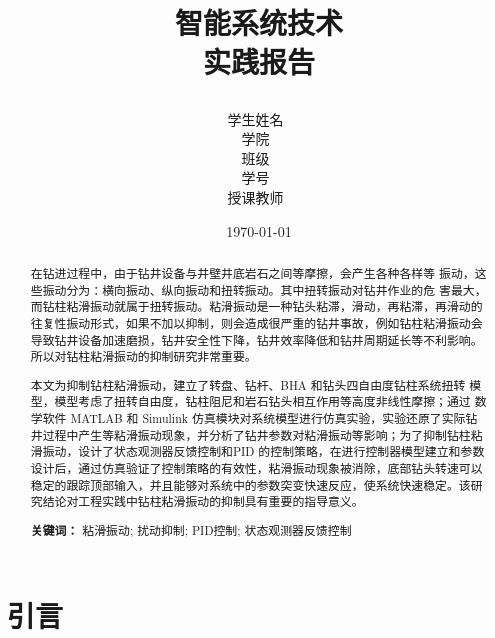 \documentclass[12pt,hyperref,a4paper,UTF8]{ctexart}
\title{ 
		\heiti \xiaochuhao \textbf{{智能系统技术\\实践报告}} \par
		\vspace{1cm}
	}
\author{
		\vspace{0.5cm}
		\kaishu\Large 学生姓名\ \dlmu[9cm]{曾康慧} \qquad \\ %
		\vspace{0.5cm}
		\kaishu\Large 学\hspace{2em}院\ \dlmu[9cm]{未来技术学院} \qquad \\ %
		\vspace{0.5cm}
		\kaishu\Large 班\hspace{2em}级\ \dlmu[9cm]{220211} \\ %
		\vspace{0.5cm}
		\kaishu\Large 学\hspace{2em}号\ \dlmu[9cm]{20211003337} \\ %
		\vspace{0.5cm}
		\kaishu\Large 授课教师\ \dlmu[9cm]{陆承达} \qquad  \\ 
	}
\date{\today} %
\begin{document}
	
	\cover
	\thispagestyle{empty} %
	
	\newpage
	\begin{abstract}
		
		在钻进过程中，由于钻井设备与井壁井底岩石之间等摩擦，会产生各种各样等 振动，这些振动分为：横向振动、纵向振动和扭转振动。其中扭转振动对钻井作业的危 害最大，而钻柱粘滑振动就属于扭转振动。粘滑振动是一种钻头粘滞，滑动，再粘滞，再滑动的往复性振动形式，如果不加以抑制，则会造成很严重的钻井事故，例如钻柱粘滑振动会导致钻井设备加速磨损，钻井安全性下降，钻井效率降低和钻井周期延长等不利影响。所以对钻柱粘滑振动的抑制研究非常重要。
		
		本文为抑制钻柱粘滑振动，建立了转盘、钻杆、BHA 和钻头四自由度钻柱系统扭转 模型，模型考虑了扭转自由度，钻柱阻尼和岩石钻头相互作用等高度非线性摩擦；通过 数学软件 MATLAB 和 Simulink 仿真模块对系统模型进行仿真实验，实验还原了实际钻井过程中产生等粘滑振动现象，并分析了钻井参数对粘滑振动等影响；为了抑制钻柱粘滑振动，设计了状态观测器反馈控制和PID 的控制策略，在进行控制器模型建立和参数设计后，通过仿真验证了控制策略的有效性，粘滑振动现象被消除，底部钻头转速可以稳定的跟踪顶部输入，并且能够对系统中的参数突变快速反应，使系统快速稳定。该研究结论对工程实践中钻柱粘滑振动的抑制具有重要的指导意义。
		
		
		
		\vspace{1cm}
		\textbf{关键词：} 粘滑振动; \hspace{0.5em} 扰动抑制; \hspace{0.5em} PID控制; \hspace{0.5em} 状态观测器反馈控制
	\end{abstract}
	\thispagestyle{empty} %
	
	\newpage
	\tableofcontents
	\thispagestyle{empty} %
	
	\newpage
	\setcounter{page}{1} %
	
	
	
	
	\section{引言}
	
\end{document}

